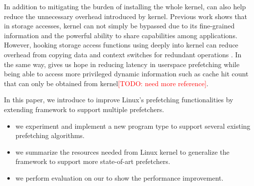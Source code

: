 In addition to mitigating the burden of installing the whole kernel, \ebpf can also help reduce the unnecessary overhead introduced by kernel. Previous work shows that in storage accesses, kernel can not simply be bypassed due to its fine-grained information and the powerful ability to share capabilities among applications. However, hooking storage access functions using \ebpf deeply into kernel can reduce overhead from copying data and context switches for redundant operations \cite{XRP, BPF_storage}. In the same way, \ebpf gives us hope in reducing latency in userspace prefetching while being able to access more privileged dynamic information such as cache hit count that can only be obtained from kernel\textcolor{red}{[TODO: need more reference]}. 



In this paper, we introduce \system to improve Linux's prefetching functionalities by extending \ebpf framework to support multiple prefetchers. 
\begin{itemize}
    \item we experiment and implement a new \ebpf program type to support several existing prefetching algorithms.
    \item we summarize the resources needed from Linux kernel to generalize the framework to support more state-of-art prefetchers.
    \item we perform evaluation on our \system to show the performance improvement.
\end{itemize}

